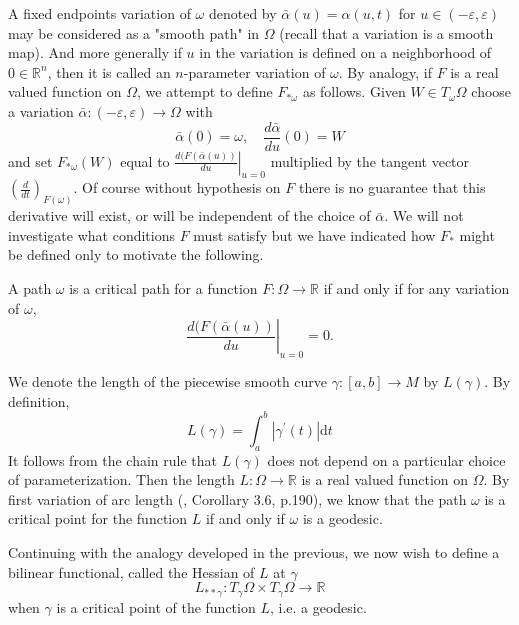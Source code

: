 \documentclass{ctexart}
\begin{document}
A fixed endpoints variation of $\omega$ denoted by $\bar{\alpha}(u)=\alpha(u,t)$ for $u\in (-\varepsilon,\varepsilon)$ may be considered as 
a "smooth path" in $\Omega$ (recall that a variation is a smooth map). And more generally if $u$ in the variation is defined on a neighborhood of $0\in\mathbb{R}^n$, 
then it is called an $n$-parameter variation of $\omega$. By analogy, if $F$ is a real valued function on $\Omega$, we attempt to define $F_{*\omega}$
as follows. Given $W \in T_\omega \Omega$ choose a variation $\bar{\alpha}:(-\varepsilon, \varepsilon) \rightarrow \Omega$ with
$$
\bar{\alpha}(0)=\omega,\quad \frac{d \bar{\alpha}}{d u}(0)=W
$$
and set $F_{* \omega}(W)$ equal to $\left.\frac{d(F(\bar{\alpha}(u))}{d u}\right|_{u=0}$ multiplied by the tangent vector
$\left(\frac{d}{d t}\right)_{F(\omega)}$. Of course without hypothesis on $F$ there is no guarantee that
this derivative will exist, or will be independent of the choice of $\bar{\alpha}$.
We will not investigate what conditions $F$ must satisfy but we have indicated how $F_*$ might be defined only to motivate the following.
\begin{definition}
  A path $\omega$ is a critical path for a function $F: \Omega\rightarrow \mathbb{R}$ if and only if for any variation of $\omega$,
  $$
  \left.\frac{d(F(\bar{\alpha}(u))}{d u}\right|_{u=0} = 0.
  $$
\end{definition}

We denote the length of the piecewise smooth curve $\gamma:[a, b] \rightarrow M$ by $L(\gamma)$. By definition,
$$
L(\gamma)=\int_a^b|\gamma^{\prime}(t)| \mathrm{d} t
$$
It follows from the chain rule that $L(\gamma)$ does not depend on a particular choice of parameterization. Then the length $L: \Omega\rightarrow\mathbb{R}$ is a real valued 
function on $\Omega$. By first variation of arc length (\cite{ChenWeiHuan2002}, Corollary 3.6, p.190), we know that the path $\omega$ is a critical point for the function $L$ if and only if $\omega$ is a geodesic.

Continuing with the analogy developed in the previous, we now wish to define a bilinear functional, called the Hessian of $L$ at $\gamma$
$$
L_{* * \gamma}: T_\gamma \Omega\times T_\gamma \Omega\rightarrow \mathbb{R}
$$
when $\gamma$ is a critical point of the function $L$, i.e. a geodesic. 
\end{document}
